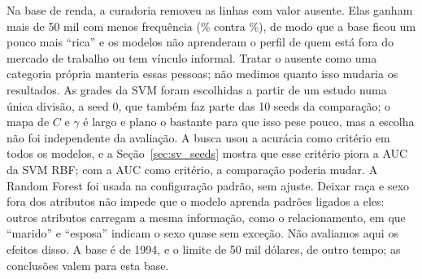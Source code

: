 Na base de renda, a curadoria removeu as \svAusentes{} linhas com valor ausente. Elas ganham mais de 50 mil com menos frequência (\svPositivosAusentes\% contra \svPositivos\%), de modo que a base ficou um pouco mais ``rica'' e os modelos não aprenderam o perfil de quem está fora do mercado de trabalho ou tem vínculo informal. Tratar o ausente como uma categoria própria manteria essas pessoas; não medimos quanto isso mudaria os resultados. As grades da SVM foram escolhidas a partir de um estudo numa única divisão, a seed 0, que também faz parte das 10 seeds da comparação; o mapa de $C$ e $\gamma$ é largo e plano o bastante para que isso pese pouco, mas a escolha não foi independente da avaliação. A busca usou a acurácia como critério em todos os modelos, e a Seção~\ref{sec:sv_seeds} mostra que esse critério piora a AUC da SVM RBF; com a AUC como critério, a comparação poderia mudar. A Random Forest foi usada na configuração padrão, sem ajuste. Deixar raça e sexo fora dos atributos não impede que o modelo aprenda padrões ligados a eles: outros atributos carregam a mesma informação, como o relacionamento, em que ``marido'' e ``esposa'' indicam o sexo quase sem exceção. Não avaliamos aqui os efeitos disso. A base é de 1994, e o limite de 50 mil dólares, de outro tempo; as conclusões valem para esta base.

